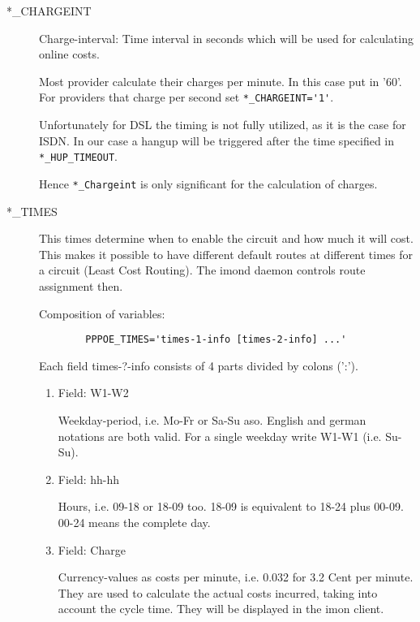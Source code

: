 \begin{description}
\item[*\_CHARGEINT]

Charge-interval: Time interval in seconds which will be used 
for calculating online costs.
 
Most provider calculate their charges per minute. In this case put in '60'. 
For providers that charge per second set \verb*?*_CHARGEINT='1'?.

Unfortunately for DSL the timing is not fully utilized, as it is the 
case for ISDN. In our case a hangup will be triggered after the time 
specified in \verb*?*_HUP_TIMEOUT?.

Hence \verb*?*_Chargeint? is only significant for the calculation of
charges.

\item[*\_TIMES]

This times determine when to enable the circuit and how much 
it will cost. This makes it possible to have different default 
routes at different times for a circuit (Least Cost Routing). 
The imond daemon controls route assignment then.

Composition of variables:

\begin{example}
\begin{verbatim}
        PPPOE_TIMES='times-1-info [times-2-info] ...'
\end{verbatim}
\end{example}

Each field times-?-info consists of 4 parts divided by colons (':').
\begin{enumerate}
\item Field: W1-W2
  
  Weekday-period, i.e. Mo-Fr or Sa-Su aso. English and german 
  notations are both valid.
  For a single weekday write W1-W1 (i.e. Su-Su).

 
\item Field: hh-hh
  
  Hours, i.e. 09-18 or 18-09 too. 18-09 is equivalent to 
  18-24 plus 00-09. 00-24 means the complete day.

        
\item Field: Charge
  
  Currency-values as costs per minute, i.e. 0.032 for 3.2 Cent 
  per minute. They are used to calculate the actual costs incurred, 
  taking into account the cycle time. They will be displayed in the imon client.
    

\end{enumerate}
\end{description}
